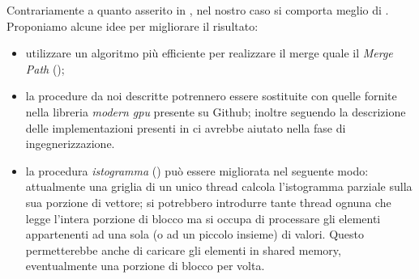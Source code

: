 Contrariamente a quanto asserito in \cite{parallelTrans}, nel nostro caso \ScanTrans{} si comporta meglio di \MergeTrans{}. Proponiamo alcune idee per migliorare il risultato:
\begin{itemize}

	\item utilizzare un algoritmo più efficiente per realizzare il merge quale il \textit{Merge Path} (\cite{mergepath});
	\item la procedure da noi descritte potrennero essere sostituite con quelle fornite nella libreria \textit{modern gpu} presente su Github; inoltre seguendo la descrizione delle implementazioni presenti in \cite{moderngpu} ci avrebbe aiutato nella fase di ingegnerizzazione.
	\item la procedura \emph{istogramma} () può essere migliorata nel seguente modo: attualmente una griglia di un unico thread calcola l'istogramma parziale sulla sua porzione di vettore; si potrebbero introdurre tante thread ognuna che legge l'intera porzione di blocco ma si occupa di processare gli elementi appartenenti ad una sola (o ad un piccolo insieme) di valori. Questo permetterebbe anche di caricare gli elementi in shared memory, eventualmente una porzione di blocco per volta.

\end{itemize}

